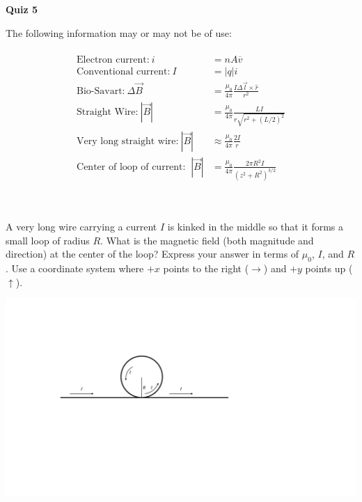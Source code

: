 \documentclass{article}
\begin{document}
\fancyfoot[C]{\thepage}
\vspace*{0cm}
\begin{center}
	{\LARGE \textbf{Quiz 5}}\\
	\vspace{0.25cm}
	\vspace{0.25cm}
\end{center}
The following information may or may not be of use:\\
\hrulefill\\
\begin{align*}
	\text{Electron current:}\ i&=nA\overline{v}\\
	\text{Conventional current:}\ I&=\left|q\right|i\\
	\text{Bio-Savart:}\ 
	\Delta \vec{B}&=\frac{\mu_0}{4\pi}\frac{I\Delta\vec{l}\times \hat{r}}{r^2}\\
	\text{Straight Wire:}\ \left|\vec{B}\right|&=\frac{\mu_0}{4\pi}\frac{LI}{r\sqrt{r^2+\left(L/2\right)^2}}\\
	\text{Very long straight wire:}\ \left|\vec{B}\right|&\approx \frac{\mu_0}{4\pi}\frac{2I}{r}\\
	\text{Center of loop of current: }\ \left|\vec{B}\right|&=\frac{\mu_0}{4\pi}\frac{2\pi R^2I}{\left(z^2+R^2\right)^{3/2}}
\end{align*}

\hrulefill \\
\\
A very long wire carrying a current $I$ is kinked in the middle so that it forms a small loop of radius $R$. What is the magnetic field (both magnitude and direction) at the center of the loop? Express your answer in terms of $\mu_0$, $I$, and $R$. Use a coordinate system where $+x$ points to the right ($\rightarrow$) and $+y$ points up ($\uparrow$).
\begin{center}
	\includegraphics[width=.75\textwidth]{quiz_img}
\end{center}
\end{document}

